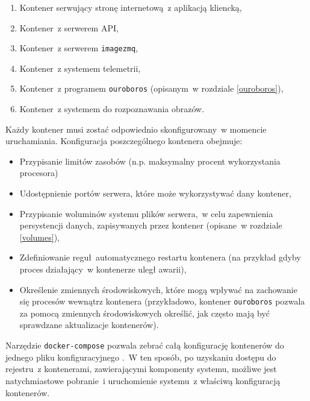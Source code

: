 \begin{enumerate}
  \item Kontener serwujący stronę internetową~z aplikacją kliencką,
  \item Kontener~z serwerem API,
  \item Kontener~z serwerem \texttt{imagezmq},
  \item Kontener~z systemem telemetrii,
  \item Kontener~z programem \texttt{ouroboros} (opisanym~w rozdziale \ref{ouroboros}),
  \item Kontener~z systemem do rozpoznawania obrazów. 
\end{enumerate}

\noindent
Każdy kontener musi zostać odpowiednio skonfigurowany~w momencie uruchamiania.
Konfiguracja poszczególnego kontenera obejmuje:

\begin{itemize}
  \item Przypisanie limitów zasobów (n.p. maksymalny procent wykorzystania procesora)
  \item Udostępnienie portów serwera, które może wykorzystywać dany kontener,
  \item Przypisanie woluminów systemu plików serwera,~w celu zapewnienia persystencji
        danych, zapisywanych przez kontener (opisane~w rozdziale \ref{volumes}),
  \item Zdefiniowanie reguł automatycznego restartu kontenera (na przykład gdyby proces
        działający~w kontenerze uległ awarii),
  \item Określenie zmiennych środowiskowych, które mogą wpływać na zachowanie się
        procesów wewnątrz kontenera (przykładowo, kontener \texttt{ouroboros} pozwala
        za pomocą zmiennych środowiskowych określić, jak często mają być sprawdzane
        aktualizacje kontenerów).
\end{itemize}

Narzędzie \texttt{docker-compose} pozwala zebrać całą konfigurację kontenerów do 
jednego pliku konfiguracyjnego \cite{docker_compose}.~W ten sposób, po uzyskaniu
dostępu do rejestru~z kontenerami, zawierającymi komponenty systemu, możliwe jest
natychmiastowe pobranie~i uruchomienie systemu~z właściwą konfiguracją kontenerów.


